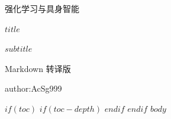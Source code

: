 \documentclass[UTF8,a4paper,11pt,fontset=none]{ctexart}
\begin{document}
\begin{titlepage}
\centering
\vspace*{35mm}
{\large 强化学习与具身智能\par}
\vspace{15mm}
{\Huge\bfseries $title$\par}
\vspace{12mm}
{\large $subtitle$\par}
\vfill
{\normalsize Markdown 转译版\par}
\vspace{4mm}
{\small author:AcSg999\par}
\vspace*{15mm}
\end{titlepage}
$if(toc)$
$if(toc-depth)$
\setcounter{tocdepth}{$toc-depth$}
$endif$
{\small\linespread{1.05}\selectfont\tableofcontents}
\clearpage
$endif$
$body$
\end{document}
